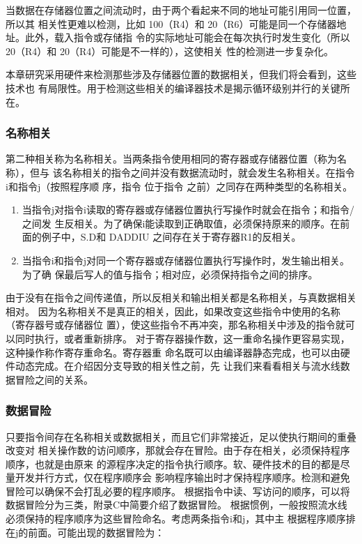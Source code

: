 当数据在存储器位置之间流动时，由于两个看起来不同的地址可能引用同一位置，所以其
相关性更难以检测，比如 100（R4）和 20（R6）可能是同一个存储器地址。此外，载入指令或存储指
令的实际地址可能会在每次执行时发生变化（所以 20（R4）和 20（R4）可能是不一样的），这使相关
性的检测进一步复杂化。

本章研究采用硬件来检测那些涉及存储器位置的数据相关，但我们将会看到，这些技术也
有局限性。用于检测这些相关的编译器技术是揭示循环级别并行的关键所在。

\subsubsection{名称相关}
第二种相关称为名称相关。当两条指令使用相同的寄存器或存储器位置（称为名称），但与
该名称相关的指令之间并没有数据流动时，就会发生名称相关。在指令i和指令j（按照程序顺
序，指令 位于指令 之前）之同存在两种类型的名称相关。

\begin{enumerate}
    \item 当指令j对指令i读取的寄存器或存储器位置执行写操作时就会在指令；和指令/之间发
    生反相关。为了确保i能读取到正确取值，必须保持原来的顺序。在前面的例子中，S.D和 DADDIU
    之间存在关于寄存器R1的反相关。
    \item 当指令i和指令j对同一个寄存器或存储器位置执行写操作时，发生输出相关。为了确
    保最后写人的值与指令；相对应，必须保持指令之间的排序。
\end{enumerate}

由于没有在指令之间传递值，所以反相关和输出相关都是名称相关，与真数据相关相对。
因为名称相关不是真正的相关，因此，如果改变这些指令中使用的名称（寄存器号或存储器位
置），使这些指令不再冲突，那名称相关中涉及的指令就可以同时执行，或者重新排序。
对于寄存器操作数，这一重命名操作更容易实现，这种操作称作寄存重命名。寄存器重
命名既可以由编译器静态完成，也可以由硬件动态完成。在介绍因分支导致的相关性之前，先
让我们来看看相关与流水线数据冒险之间的关系。

\subsubsection{数据冒险}
只要指令间存在名称相关或数据相关，而且它们非常接近，足以使执行期间的重叠改变对
相关操作数的访问顺序，那就会存在冒险。由于存在相关，必须保持程序顺序，也就是由原来
的源程序决定的指令执行顺序。软、硬件技术的目的都是尽量开发并行方式，仅在程序顺序会
影响程序输出时才保持程序顺序。检测和避免冒险可以确保不会打乱必要的程序顺序。
根据指令中读、写访问的顺序，可以将数据冒险分为三类，附录C中简要介绍了数据冒险。
根据惯例，一般按照流水线必须保持的程序顺序为这些冒险命名。考虑两条指令i和j，其中主
根据程序顺序排在j的前面。可能出现的数据冒险为：

